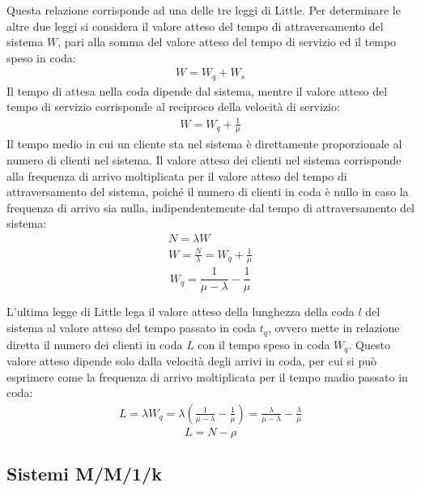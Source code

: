\documentclass{article}
\numberwithin{equation}{subsection}
\begin{document}
Questa relazione corrisponde ad una delle tre leggi di Little. 
Per determinare le altre due leggi si considera il valore atteso del tempo di attraversamento del sistema $W$, pari alla somma del valore atteso del tempo di 
servizio ed il tempo speso in coda:
\begin{gather*}
    W=W_q+W_s
\end{gather*}
Il tempo di attesa nella coda dipende dal sistema, mentre il valore atteso del tempo di servizio corrisponde al reciproco della velocità di servizio:
\begin{gather*}
    W=W_q+\displaystyle\frac{1}{\mu}
\end{gather*}
Il tempo medio in cui un cliente sta nel sistema è direttamente proporzionale al numero di clienti nel sistema. Il valore atteso dei clienti nel sistema corrisponde alla 
frequenza di arrivo moltiplicata per il valore atteso del tempo di attraversamento del sistema, poiché il numero di clienti in coda è nullo in caso la frequenza di arrivo 
sia nulla, indipendentemente dal tempo di attraversamento del sistema:
\begin{gather*}
    N=\lambda W\\
    W =\displaystyle\frac{N}{\lambda}=W_q+\frac{1}{\mu}
\end{gather*}
\begin{equation}
    W_q=\displaystyle\frac{1}{\mu-\lambda}-\frac{1}{\mu}
\end{equation}

L'ultima legge di Little lega il valore atteso della lunghezza della coda $l$ del sistema al valore atteso del tempo passato in coda $t_q$, ovvero mette in relazione diretta il numero 
dei clienti in coda $L$ con il tempo speso in coda $W_q$. Questo valore atteso dipende solo dalla velocità degli arrivi in coda, per cui si può esprimere come la frequenza di 
arrivo moltiplicata per il tempo madio passato in coda:
\begin{gather*}
    L=\lambda W_q=\lambda\left(\displaystyle\frac{1}{\mu-\lambda}-\frac{1}{\mu}\right)=\frac{\lambda}{\mu-\lambda}-\frac{\lambda}{\mu}
\end{gather*}
\begin{equation}
    L=N-\rho
\end{equation}

\subsection{Sistemi M/M/1/k}
\end{document}
